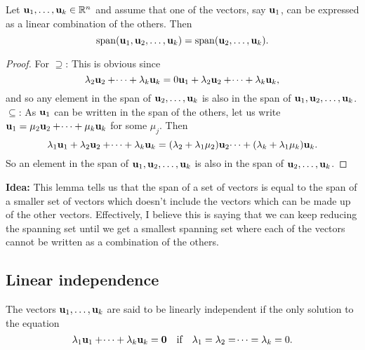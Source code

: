 \documentclass[10pt, a4paper]{article}
\begin{document}
\begin{lemma}
    Let $\mathbf{u}_1, \dotsc, \mathbf{u}_k \in \mathbb{R} ^ n$ and assume that one of the vectors,
    say $\mathbf{u}_1$,
    can be expressed as a linear combination of the others.
    Then
    \[
    \mathrm{span}(\mathbf{u}_1, \mathbf{u}_2, \dotsc, \mathbf{u}_k) = \mathrm{span}(\mathbf{u}_2, \dotsc, \mathbf{u}_k).
    \]
    \begin{proof}
        For $\supseteq$:
        This is obvious since
        \[
        \lambda_2\mathbf{u}_2 + \dotsi + \lambda_k\mathbf{u}_k = 0\mathbf{u}_1 + \lambda_2\mathbf{u}_2 + \dotsi + \lambda_k\mathbf{u}_k,
        \]
        and so any element in the span of $\mathbf{u}_2, \dotsc, \mathbf{u}_k$ is also in the span of $\mathbf{u}_1, \mathbf{u}_2, \dotsc, \mathbf{u}_k$.
        $\subseteq$:
        As $\mathbf{u}_1$ can be written in the span of the others,
        let us write $\mathbf{u}_1 = \mu_2\mathbf{u}_2 + \dotsi + \mu_k\mathbf{u}_k$ for some $\mu_j$.
        Then
        \[
        \lambda_1\mathbf{u}_1 + \lambda_2\mathbf{u}_2 + \dotsi + \lambda_k\mathbf{u}_k = (\lambda_2 + \lambda_1\mu_2)\mathbf{u}_2 \dotsi + (\lambda_k + \lambda_1\mu_k)\mathbf{u}_k.
        \]
        So an element in the span of $\mathbf{u}_1, \mathbf{u}_2, \dotsc, \mathbf{u}_k$ is also in the span of $\mathbf{u}_2, \dotsc, \mathbf{u}_k$.
    \end{proof}
\end{lemma}

\textbf{Idea:}
This lemma tells us that the span of a set of vectors is equal to the span of a smaller set of vectors which doesn't include the vectors which can be made up of the other vectors.
Effectively,
I believe this is saying that we can keep reducing the spanning set until we get a smallest spanning set where each of the vectors cannot be written as a combination of the others.

\subsection{Linear independence}

\begin{definition}
    The vectors $\mathbf{u}_1, \dotsc, \mathbf{u}_k$ are said to be linearly independent if the only solution to the equation
    \[
    \lambda_1\mathbf{u}_1 + \dotsi + \lambda_k\mathbf{u}_k = \mathbf{0}\quad\text{if}\quad\lambda_1 = \lambda_2 = \dotsi = \lambda_k = 0.
    \]
\end{definition}
\end{document}
